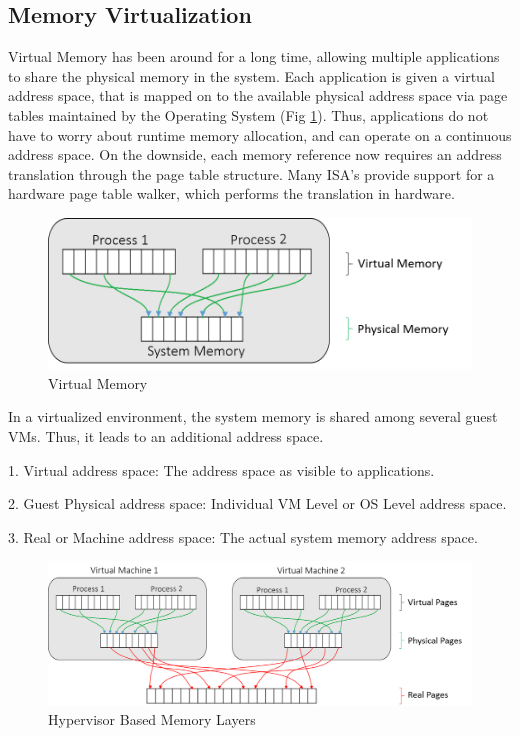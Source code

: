 \subsection{Memory Virtualization}
Virtual Memory has been around for a long time, allowing multiple applications to share the physical memory in the system. Each application is given a virtual address space, that is mapped on to the available physical address space via page tables maintained by the Operating System (Fig \ref{fig:virt_mem}). Thus, applications do not have to worry about runtime memory allocation, and can operate on a continuous address space. On the downside, each memory reference now requires an address translation through the page table structure. Many ISA’s provide support for a hardware page table walker, which performs the translation in hardware. 

\setlength{\belowcaptionskip}{-10pt}

\begin{figure}[H]
  \centering
  \includegraphics[scale=0.8]{figures/virt_mem.png}
  \caption{Virtual Memory}
  \label{fig:virt_mem}
\end{figure}
In a virtualized environment, the system memory is shared among several guest VMs. Thus, it leads to an additional address space.

1. Virtual address space: The address space as visible to applications.

2. Guest Physical address space: Individual VM Level or OS Level address space.

3. Real or Machine address space: The actual system memory address space.

\setlength{\belowcaptionskip}{-10pt}

\begin{figure}[H]
  \centering
  \includegraphics[scale=0.65]{figures/hyp_mem_map_comp.png}
  \caption{Hypervisor Based Memory Layers}
  \label{fig:hyper_mem}
\end{figure}

